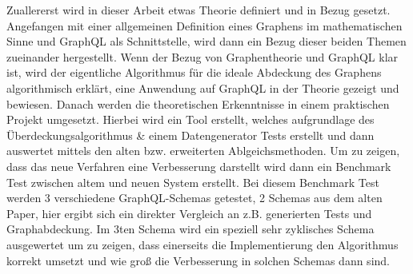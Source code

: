 Zuallererst wird in dieser Arbeit etwas Theorie definiert und in Bezug gesetzt. Angefangen mit einer allgemeinen Definition
eines Graphens im mathematischen Sinne und GraphQL als Schnittstelle, wird dann ein Bezug dieser beiden Themen
zueinander hergestellt. Wenn der Bezug von Graphentheorie und GraphQL klar ist, wird der eigentliche Algorithmus für die
ideale Abdeckung des Graphens algorithmisch erklärt, eine Anwendung auf GraphQL in der Theorie gezeigt und bewiesen.
Danach werden die theoretischen Erkenntnisse in einem praktischen Projekt umgesetzt. Hierbei wird ein Tool erstellt,
welches aufgrundlage des Überdeckungsalgorithmus \& einem Datengenerator Tests erstellt und dann auswertet mittels
den alten bzw. erweiterten Ablgeichsmethoden. Um zu zeigen, dass das neue Verfahren eine Verbesserung darstellt wird dann
ein Benchmark Test zwischen altem und neuen System erstellt. Bei diesem Benchmark Test werden 3 verschiedene
GraphQL-Schemas getestet, 2 Schemas aus dem alten Paper, hier ergibt sich ein direkter Vergleich an z.B. generierten Tests und
Graphabdeckung. Im 3ten Schema wird ein speziell sehr zyklisches Schema ausgewertet um zu zeigen, dass einerseits die Implementierung
den Algorithmus korrekt umsetzt und wie groß die Verbesserung in solchen Schemas dann sind.